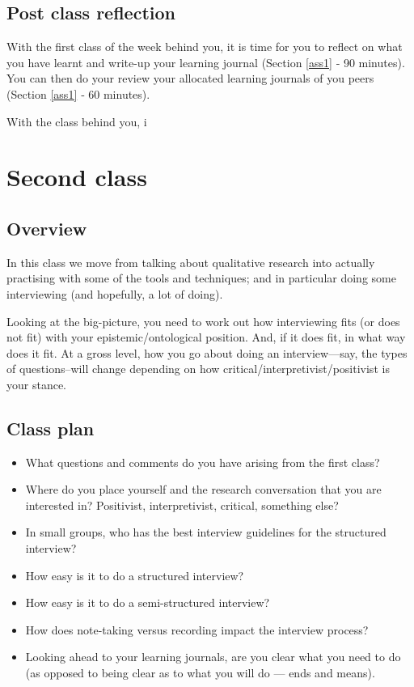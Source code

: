 \documentclass[]{book}
\theoremstyle{definition}
\theoremstyle{definition}
\theoremstyle{definition}
\theoremstyle{remark}
\begin{document}
\hypertarget{post-class-reflection}{%
\subsection{Post class reflection}\label{post-class-reflection}}

With the first class of the week behind you, it is time for you to
reflect on what you have learnt and write-up your learning journal
(Section \ref{ass1} ‐ 90 minutes). You can then do your review your
allocated learning journals of you peers (Section \ref{ass1} ‐ 60
minutes).

With the class behind you, i

\hypertarget{second-class}{%
\section*{Second class}\label{second-class}}

\hypertarget{overview-1}{%
\subsection*{Overview}\label{overview-1}}

In this class we move from talking about qualitative research into
actually practising with some of the tools and techniques; and in
particular doing some interviewing (and hopefully, a lot of doing).

Looking at the big-picture, you need to work out how interviewing fits
(or does not fit) with your epistemic/ontological position. And, if it
does fit, in what way does it fit. At a gross level, how you go about
doing an interview---say, the types of questions--will change depending
on how critical/interpretivist/positivist is your stance.

\hypertarget{class-plan-1}{%
\subsection*{Class plan}\label{class-plan-1}}

\begin{itemize}
\item
  What questions and comments do you have arising from the first class?
\item
  Where do you place yourself and the research conversation that you are
  interested in? Positivist, interpretivist, critical, something else?
\item
  In small groups, who has the best interview guidelines for the
  structured interview?
\item
  How easy is it to do a structured interview?
\item
  How easy is it to do a semi-structured interview?
\item
  How does note-taking versus recording impact the interview process?
\item
  Looking ahead to your learning journals, are you clear what you need
  to do (as opposed to being clear as to what you will do --- ends and
  means).
\end{itemize}
\end{document}
